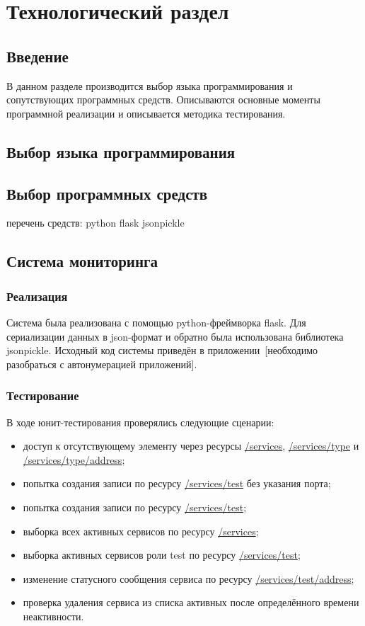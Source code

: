 \documentclass[a4paper,12pt]{report}
\numberwithin{equation}{section}
\begin{document}
\clearpage
\section{Технологический раздел}
\subsection{Введение}
В данном разделе производится выбор языка программирования и сопутствующих программных средств. 
Описываются основные моменты программной реализации и описывается методика тестирования.

\subsection{Выбор языка программирования}

\subsection{Выбор программных средств}
перечень средств:
python
  flask
  jsonpickle
  

\subsection{Система мониторинга}
\subsubsection{Реализация}
Система была реализована с помощью python-фреймворка flask.
Для сериализации данных в json-формат и обратно была использована библиотека jsonpickle.
Исходный код системы приведён в приложении~[необходимо разобраться с автонумерацией приложений].

\subsubsection{Тестирование}
В ходе юнит-тестирования проверялись следующие сценарии:

\begin{itemize}
  \item доступ к отсутствующему элементу через ресурсы \url{/services}, \url{/services/type} и \url{/services/type/address};
  \item попытка создания записи по ресурсу \url{/services/test} без указания порта;
  \item попытка создания записи по ресурсу \url{/services/test};
  \item выборка всех активных сервисов по ресурсу \url{/services};
  \item выборка активных сервисов роли test по ресурсу \url{/services/test};
  \item изменение статусного сообщения сервиса по ресурсу \url{/services/test/address};
  \item проверка удаления сервиса из списка активных после определённого времени неактивности.
\end{itemize}
\end{document}
